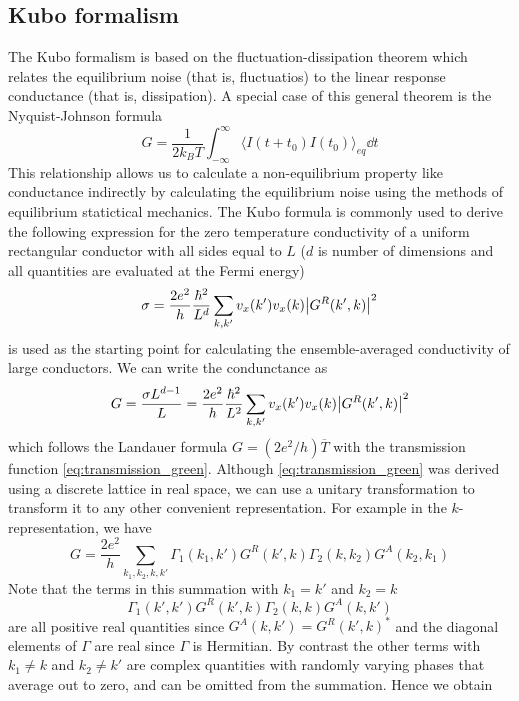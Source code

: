 \documentclass[11pt,a4paper]{book}
\theoremstyle{plain}
\theoremstyle{definition}
\theoremstyle{remark}
\begin{document}
\subsection{Kubo formalism}
The Kubo formalism is based on the fluctuation-dissipation theorem which relates the equilibrium noise (that is, fluctuatios) to the linear response conductance (that is, dissipation). A special case of this general theorem is the Nyquist-Johnson formula
\begin{equation}
    G = \frac{1}{2 k_B T} \int_{-\infty}^{\infty} \langle I(t+t_0) I(t_0) \rangle_{eq} \dd t
\end{equation}
This relationship allows us to calculate a non-equilibrium property like conductance indirectly by calculating the equilibrium noise using the methods of equilibrium statictical mechanics. The Kubo formula is commonly used to derive the following expression for the zero temperature conductivity of a uniform rectangular conductor with all sides equal to $L$ ($d$ is number of dimensions and all quantities are evaluated at the Fermi energy)
\begin{equation}
    \sigma = \frac{2 e^2}{h} \frac{\hbar^2}{L^d} \sum_{k,k'} v_x(k') v_x(k) \abs{G^R(k',k)}^2
\end{equation}
is used as the starting point for calculating the ensemble-averaged conductivity of large conductors. We can write the condunctance as 
\begin{equation}
    G = \frac{\sigma L^{d-1}}{L} = \frac{2 e^2}{h} \frac{\hbar^2}{L^2} \sum_{k,k'} v_x(k') v_x(k) \abs{G^R(k',k)}^2
\end{equation}
which follows the Landauer formula $G = (2e^2/h)\overline{T}$ with the transmission function \ref{eq:transmission_green}. Although \ref{eq:transmission_green} was derived using a discrete lattice in real space, we can use a unitary transformation to transform it to any other convenient representation. For example in the $k$-representation, we have
\begin{equation}
    G = \frac{2 e^2}{h} \sum_{k_1,k_2,k,k'} \Gamma_1(k_1,k') G^R(k',k) \Gamma_2(k,k_2) G^A(k_2,k_1)
\end{equation}
Note that the terms in this summation with $k_1 = k'$ and $k_2 = k$
\begin{equation}
    \Gamma_1(k',k') G^R(k',k) \Gamma_2(k,k) G^A(k,k')
\end{equation}
are all positive real quantities since $G^A(k,k') = G^R(k',k)^*$ and the diagonal elements of $\Gamma$ are real since $\Gamma$ is Hermitian. By contrast the other terms with $k_1 \neq k$ and $ k_2 \neq k'$ are complex quantities with randomly varying phases that average out to zero, and can be omitted from the summation. Hence we obtain
\end{document}
